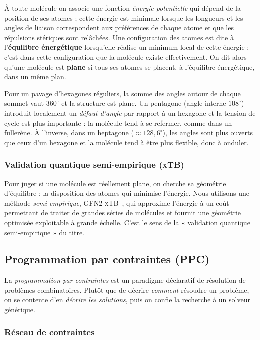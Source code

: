 \documentclass[11pt,a4paper]{article}
\newcommand{\xtb}{\textsc{xTB}}
\begin{document}
À toute molécule on associe une fonction \emph{énergie potentielle} qui dépend
de la position de ses atomes ; cette énergie est minimale lorsque les longueurs
et les angles de liaison correspondent aux préférences de chaque atome et que
les répulsions stériques sont relâchées. Une configuration des atomes est dite
à l'\textbf{équilibre énergétique} lorsqu'elle réalise un minimum local de
cette énergie ; c'est dans cette configuration que la molécule existe
effectivement. On dit alors qu'une molécule est \textbf{plane} si tous ses
atomes se placent, à l'équilibre énergétique, dans un même plan.

Pour un pavage d'hexagones réguliers, la somme des angles autour de chaque
sommet vaut $360^\circ$ et la structure est plane. Un pentagone (angle
interne $108^\circ$) introduit localement un \emph{défaut d'angle} par
rapport à un hexagone et la tension de cycle est plus importante : la
molécule tend à se refermer, comme dans un fullerène. À l'inverse, dans un
heptagone ($\approx 128{,}6^\circ$), les angles sont plus ouverts que ceux
d'un hexagone et la molécule tend à être plus flexible, donc à onduler.

\subsubsection{Validation quantique semi-empirique (\xtb{})}

Pour juger si une molécule est réellement plane, on cherche sa géométrie
d'équilibre : la disposition des atomes qui minimise l'énergie. Nous utilisons
une méthode \emph{semi-empirique}, GFN2-\xtb{}~\cite{xtb}, qui approxime
l'énergie à un coût permettant de traiter de grandes séries de molécules et
fournit une géométrie optimisée exploitable à grande échelle. C'est le sens de
la « validation quantique semi-empirique » du titre.

\subsection{Programmation par contraintes (PPC)}
\label{sec:ppc}

La \emph{programmation par contraintes} est un paradigme déclaratif de
résolution de problèmes combinatoires. Plutôt que de décrire
\emph{comment} résoudre un problème, on se contente d'en \emph{décrire
les solutions}, puis on confie la recherche à un solveur générique.

\subsubsection{Réseau de contraintes}
\end{document}
